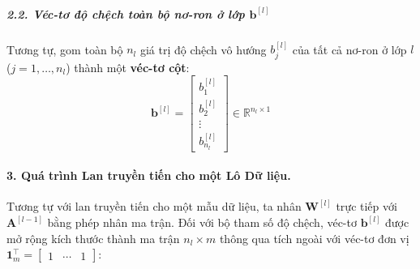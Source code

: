 \subparagraph{2.2. Véc-tơ độ chệch toàn bộ nơ-ron ở lớp $\mathbf{b}^{[l]}$\\}
Tương tự, gom toàn bộ $n_l$ giá trị độ chệch vô hướng $b_j^{[l]}$ của tất cả nơ-ron ở lớp $l$ ($j = 1, \dots, n_l$) thành một \textbf{véc-tơ cột}:
$$\mathbf{b}^{[l]} = \begin{bmatrix} b_1^{[l]} \\ b_2^{[l]} \\ \vdots \\ b_{n_l}^{[l]} \end{bmatrix} \in \mathbb{R}^{n_l \times 1}$$

\paragraph{3. Quá trình Lan truyền tiến cho một Lô Dữ liệu.\\}
Tương tự với lan truyền tiến cho một mẫu dữ liệu, ta nhân $\mathbf{W}^{[l]}$ trực tiếp với $\mathbf{A}^{[l-1]}$ bằng phép nhân ma trận. Đối với bộ tham số độ chệch, véc-tơ $\mathbf{b}^{[l]}$ được mở rộng kích thước thành ma trận $n_l \times m$ thông qua tích ngoài với véc-tơ đơn vị $\mathbf{1}_m^{\top} = \begin{bmatrix} 1 & \cdots & 1 \end{bmatrix}$:

